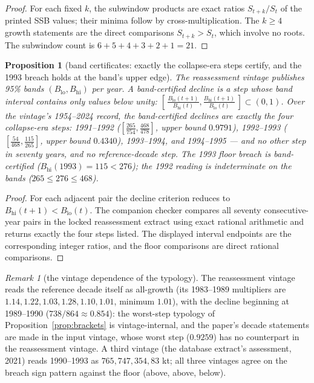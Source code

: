 \documentclass[10pt,twocolumn]{article}
\theoremstyle{plain}
\newtheorem{proposition}[theorem]{Proposition}
\theoremstyle{remark}
\newtheorem{remark}[theorem]{Remark}
\begin{document}
\begin{proof}
For each fixed \(k\), the subwindow products are exact ratios
\(S_{t+k}/S_t\) of the printed SSB values; their minima follow by
cross-multiplication. The \(k \ge 4\) growth statements are the direct
comparisons \(S_{t+k} > S_t\), which involve no roots. The subwindow
count is \(6+5+4+3+2+1 = 21\).
\end{proof}

\begin{proposition}[band certificates: exactly the collapse-era steps
certify, and the 1993 breach holds at the band's upper edge]
\label{prop:bands}
The reassessment vintage publishes 95\% bands \((B_{\mathrm{lo}},
B_{\mathrm{hi}})\) per year. A band-certified decline is a step whose
band interval contains only values below unity:
\([\,\tfrac{B_{\mathrm{lo}}(t+1)}{B_{\mathrm{hi}}(t)},
\tfrac{B_{\mathrm{hi}}(t+1)}{B_{\mathrm{lo}}(t)}\,] \subset (0,1)\).
Over the vintage's 1954--2024 record, the band-certified declines are
exactly the four collapse-era steps: 1991--1992
(\([\tfrac{265}{754}, \tfrac{468}{478}]\), upper bound \(0.9791\)),
1992--1993 (\([\tfrac{54}{468}, \tfrac{115}{265}]\), upper bound
\(0.4340\)), 1993--1994, and 1994--1995 --- and no other step in
seventy years, and no reference-decade step. The 1993 floor breach is
band-certified (\(B_{\mathrm{hi}}(1993) = 115 < 276\)); the 1992
reading is indeterminate on the bands (\(265 \le 276 \le 468\)).
\end{proposition}

\begin{proof}
For each adjacent pair the decline criterion reduces to
\(B_{\mathrm{hi}}(t+1) < B_{\mathrm{lo}}(t)\). The companion checker
compares all seventy consecutive-year pairs in the locked reassessment
extract using exact rational arithmetic and returns exactly the four
steps listed. The displayed interval endpoints are the corresponding
integer ratios, and the floor comparisons are direct rational comparisons.
\end{proof}

\begin{remark}[the vintage dependence of the typology]
\label{rem:vintagetypology}
The reassessment vintage reads the reference decade itself as
all-growth (its 1983--1989 multipliers are \(1.14, 1.22, 1.03, 1.28,
1.10, 1.01\), minimum \(1.01\)), with the decline beginning at
1989--1990 (\(738/864 \approx 0.854\)): the worst-step typology of
Proposition~\ref{prop:brackets} is vintage-internal, and the
paper's decade statements are made in the input vintage, whose
worst step (\(0.9259\)) has no counterpart in the reassessment
vintage. A third vintage (the database extract's assessment, 2021)
reads 1990--1993 as \(765, 747, 354, 83\) kt; all three vintages
agree on the breach sign pattern against the floor (above, above,
below).
\end{remark}
\end{document}
